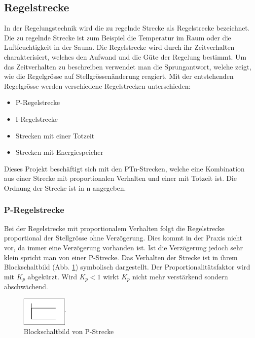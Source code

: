 \subsection{Regelstrecke}
In  der  Regelungstechnik  wird  die  zu  regelnde  Strecke  als  Regelstrecke
bezeichnet. Die  zu   regelnde  Strecke   ist  zum  Beispiel   die  Temperatur
im  Raum  oder  die  Luftfeuchtigkeit  in  der  Sauna. Die  Regelstrecke  wird
durch  ihr   Zeitverhalten  charakterisiert,  welches  den   Aufwand  und  die
G\"ute   der   Regelung   bestimmt. Um  das   Zeitverhalten   zu   beschreiben
verwendet  man die  Sprungantwort,  welche zeigt,  wie  die Regelgr\"osse  auf
Stellgr\"ossen\"anderung reagiert. Mit  der entstehenden  Regelgr\"osse werden
verschiedene Regelstrecken unterschieden:

\begin{itemize}
    \item
        P-Regelstrecke
    \item
        I-Regelstrecke
    \item
        Strecken mit einer Totzeit
    \item
        Strecken mit Energiespeicher
\end{itemize}

Dieses  Projekt   besch\"aftigt  sich   mit  den  PTn-Strecken,   welche  eine
Kombination  aus einer  Strecke  mit proportionalen  Verhalten  und einer  mit
Totzeit ist. Die Ordnung der Strecke ist in n angegeben.

\subsubsection*{P-Regelstrecke}
Bei  der  Regelstrecke mit  proportionalem  Verhalten  folgt die  Regelstrecke
proportional der  Stellgr\"osse ohne  Verz\"ogerung. Dies kommt in  der Praxis
nicht vor,  da immer eine  Verz\"ogerung vorhanden ist. Ist  die Verz\"ogerung
jedoch  sehr  klein  spricht  man   von  einer  P-Strecke. Das  Verhalten  der
Strecke  ist in  ihrem Blockschaltbild  (Abb. \ref  {fig:PStrecke}) symbolisch
dargestellt. Der  Proportionalit\"atsfaktor wird  mit $K_p$  abgek\"urzt. Wird
$K_p<1$ wirkt $K_p$ nicht mehr verst\"arkend sondern abschw\"achend.

\begin{figure}[h!, width=\pagewidth]
    \centering
    \includegraphics[width=0.2\textwidth]{images/PStrecke}
    \caption{Blockschaltbild von P-Strecke}
    \label{fig:PStrecke}
\end{figure}


